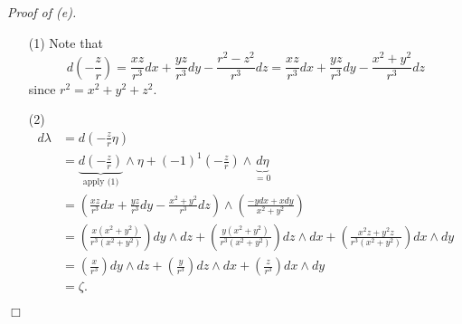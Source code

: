\documentclass{article}
\begin{document}
\emph{Proof of (e).}
\begin{enumerate}
\item[(1)]
  Note that
  \[
    d \left( -\frac{z}{r} \right)
    = \frac{xz}{r^3} dx + \frac{yz}{r^3} dy - \frac{r^2-z^2}{r^3} dz
    = \frac{xz}{r^3} dx + \frac{yz}{r^3} dy - \frac{x^2+y^2}{r^3} dz
  \]
  since $r^2 = x^2+y^2+z^2$.

\item[(2)]
  \begin{align*}
    d\lambda
    &= d \left( -\frac{z}{r}\eta \right) \\
    &= \underbrace{d \left( -\frac{z}{r} \right)}_{\text{apply (1)}} \wedge \eta
      + (-1)^1 \left( -\frac{z}{r} \right) \wedge \underbrace{d\eta}_{= 0} \\
    &= \left( \frac{xz}{r^3} dx + \frac{yz}{r^3} dy - \frac{x^2+y^2}{r^3} dz \right)
      \wedge \left( \frac{-ydx + xdy}{x^2+y^2} \right) \\
    &= \left( \frac{x(x^2+y^2)}{r^3(x^2+y^2)} \right) dy \wedge dz
      + \left( \frac{y(x^2+y^2)}{r^3(x^2+y^2)} \right) dz \wedge dx
      + \left( \frac{x^2 z + y^2 z}{r^3(x^2+y^2)} \right) dx \wedge dy \\
    &= \left( \frac{x}{r^3} \right) dy \wedge dz
      + \left( \frac{y}{r^3} \right) dz \wedge dx
      + \left( \frac{z}{r^3} \right) dx \wedge dy \\
    &= \zeta.
  \end{align*}
\end{enumerate}
$\Box$ \\
\end{document}
